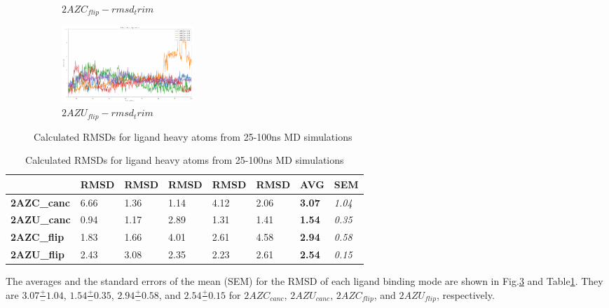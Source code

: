 \documentclass[fleqn,10pt]{wlscirep}
\begin{document}
\begin{figure}[!ht]
\begin{subfigure}{.45\textwidth}
     \caption{$2AZC_{flip}-rmsd_trim$}
     \label{fig:2AZC_flip-rmsd_trim}
   \end{subfigure}
    \begin{subfigure}{.45\textwidth}
     \centering
     \includegraphics[width=.95\linewidth]{2AZU_flip/2AZU_flip-rmsd-trim}
     \caption{$2AZU_{flip}-rmsd_trim$}
     \label{fig:2AZU_flip-rmsd_trim}
   \end{subfigure}
\caption{Calculated RMSDs for ligand heavy atoms from 25-100ns MD simulations}
\label{fig:rmsd}
\end{figure}

\begin{table}[!ht]
\caption{Calculated RMSDs for ligand heavy atoms from 25-100ns MD simulations}
\label{table:rmsd}
\begin{tabular}{|l|l|l|l|l|l|l|l|}
\hline
                    & RMSD & RMSD & RMSD & RMSD & RMSD & \textbf{AVG}  & SEM           \\ \hline
\textbf{2AZC\_canc} & 6.66 & 1.36 & 1.14 & 4.12 & 2.06 & \textbf{3.07} & \textit{1.04} \\ \hline
\textbf{2AZU\_canc} & 0.94 & 1.17 & 2.89 & 1.31 & 1.41 & \textbf{1.54} & \textit{0.35} \\ \hline
\textbf{2AZC\_flip} & 1.83 & 1.66 & 4.01 & 2.61 & 4.58 & \textbf{2.94} & \textit{0.58} \\ \hline
\textbf{2AZU\_flip} & 2.43 & 3.08 & 2.35 & 2.23 & 2.61 & \textbf{2.54} & \textit{0.15} \\ \hline

\end{tabular}
\end{table}

The averages and the standard errors of the mean (SEM) for the RMSD of each ligand binding mode are shown in Fig.\ref{fig:rmsd} and Table\ref{table:rmsd}.
They are $3.07 \frac{+}{-} 1.04$, $1.54 \frac{+}{-} 0.35$, $2.94 \frac{+}{-} 0.58$, and $2.54 \frac{+}{-} 0.15$ for $2AZC_{canc}$, $2AZU_{canc}$, $2AZC_{flip}$, and $2AZU_{flip}$, respectively.
\end{document}
